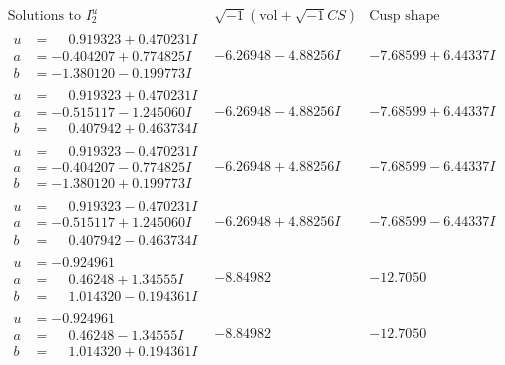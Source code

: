 \documentclass[1p]{elsarticle_modified}
\theoremstyle{definition}
\newcommand{\I}{\sqrt{-1}}
\begin{document}
$$\begin{array}{c|c|c}  
\text{Solutions to }I^u_{2}& \I (\text{vol} + \sqrt{-1}CS) & \text{Cusp shape}\\
 \hline 
\begin{aligned}
u &= \phantom{-}0.919323 + 0.470231 I \\
a &= -0.404207 + 0.774825 I \\
b &= -1.380120 - 0.199773 I\end{aligned}
 & -6.26948 - 4.88256 I & -7.68599 + 6.44337 I \\ \hline\begin{aligned}
u &= \phantom{-}0.919323 + 0.470231 I \\
a &= -0.515117 - 1.245060 I \\
b &= \phantom{-}0.407942 + 0.463734 I\end{aligned}
 & -6.26948 - 4.88256 I & -7.68599 + 6.44337 I \\ \hline\begin{aligned}
u &= \phantom{-}0.919323 - 0.470231 I \\
a &= -0.404207 - 0.774825 I \\
b &= -1.380120 + 0.199773 I\end{aligned}
 & -6.26948 + 4.88256 I & -7.68599 - 6.44337 I \\ \hline\begin{aligned}
u &= \phantom{-}0.919323 - 0.470231 I \\
a &= -0.515117 + 1.245060 I \\
b &= \phantom{-}0.407942 - 0.463734 I\end{aligned}
 & -6.26948 + 4.88256 I & -7.68599 - 6.44337 I \\ \hline\begin{aligned}
u &= -0.924961\phantom{ +0.000000I} \\
a &= \phantom{-}0.46248 + 1.34555 I \\
b &= \phantom{-}1.014320 - 0.194361 I\end{aligned}
 & -8.84982\phantom{ +0.000000I} & -12.7050\phantom{ +0.000000I} \\ \hline\begin{aligned}
u &= -0.924961\phantom{ +0.000000I} \\
a &= \phantom{-}0.46248 - 1.34555 I \\
b &= \phantom{-}1.014320 + 0.194361 I\end{aligned}
 & -8.84982\phantom{ +0.000000I} & -12.7050\phantom{ +0.000000I} \\ \hline\begin{aligned}

\end{aligned}
\end{array}$$
\end{document}
